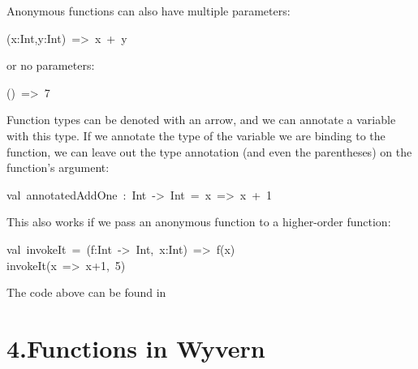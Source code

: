 \documentclass{article}
\begin{document}
Anonymous functions can also have multiple parameters:%
\begin{mdpre}%
\noindent(x:Int,y:Int)~=\textgreater{}~x~+~y\\
\end{mdpre}\noindent{}or no parameters:
\begin{mdpre}%
\noindent()~=\textgreater{}~7%
\end{mdpre}\noindent{}Function types can be denoted with an arrow, and we can annotate
a variable with this type.  If we annotate the type of the variable
we are binding to the function, we can leave out the type annotation
(and even the parentheses) on the function's argument:
\begin{mdpre}%
\noindent val~annotatedAddOne~:~Int~-\textgreater{}~Int~=~x~=\textgreater{}~x~+~1\\
\end{mdpre}\noindent{}This also works if we pass an anonymous function to a higher-order
function:
\begin{mdpre}%
\noindent val~invokeIt~=~(f:Int~-\textgreater{}~Int,~x:Int)~=\textgreater{}~f(x)\\
invokeIt(x~=\textgreater{}~x+1,~5)%
\end{mdpre}\noindent{}The code above can be found in 

\section{4.\hspace*{0.5em}Functions in Wyvern}\label{sec-functions-in-wyvern}%
\end{document}
